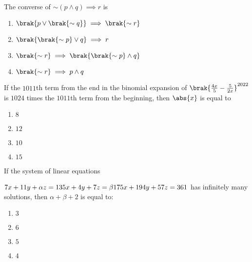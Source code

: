\item The converse of $\sim(p \land q) \implies r$ is  \hfill {}
\begin{multicols}{2}
\begin{enumerate}
    \item $\brak{p \lor \brak{\sim q}} \implies \brak{ \sim r}$ 
    \item $\brak{\brak{\sim p} \lor q} \implies  r$
    \item $\brak{\sim r} \implies \brak{ \brak{\sim p} \land q}$ 
    \item $\brak{\sim r} \implies  p \land q$
\end{enumerate}
\end{multicols}



\item If the $1011$th term from the end in the binomial expansion of $\brak{\frac{4x}{5} - \frac{5}{2x} }^{2022}$ is $1024$ times the $1011$th term from the beginning, then $\abs{x}$ is equal to  \hfill {}
\begin{multicols}{4}
\begin{enumerate}
    \item $8$ 
    \item $12$ 
    \item $10$ 
    \item $15$ 
\end{enumerate}
\end{multicols}


\item If the system of linear equations 

$7x + 11y + \alpha z = 13\\5x + 4y + 7z = \beta \\175x + 194y + 57z = 361$ has infinitely many solutions, then $\alpha + \beta + 2$ is equal to: \hfill {}
\begin{multicols}{4}
\begin{enumerate}
    \item $3$ 
    \item $6$ 
    \item $5$ 
    \item $4$ 
\end{enumerate}
\end{multicols}

%

